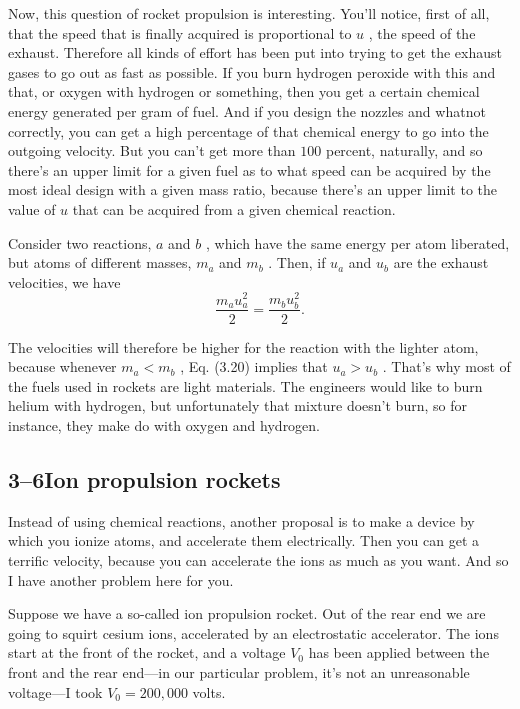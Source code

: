 \documentclass[11pt,oneside]{article}
\begin{document}
Now, this question of rocket propulsion is interesting. You'll notice, first of all, that the speed that is finally acquired is proportional to \(u\) , the speed of the exhaust. Therefore all kinds of effort has been put into trying to get the exhaust gases to go out as fast as possible. If you burn hydrogen peroxide with this and that, or oxygen with hydrogen or something, then you get a certain chemical energy generated per gram of fuel. And if you design the nozzles and whatnot correctly, you can get a high percentage of that chemical energy to go into the outgoing velocity. But you can't get more than \(100\) percent, naturally, and so there's an upper limit for a given fuel as to what speed can be acquired by the most ideal design with a given mass ratio, because there's an upper limit to the value of \(u\) that can be acquired from a given chemical reaction.\par

Consider two reactions, \(a\) and \(b\) , which have the same energy per atom liberated, but atoms of different masses, \(m_a\) and \(m_b\) . Then, if \(u_a\) and \(u_b\) are the exhaust velocities, we have 
\begin{equation*} \tag{3.20}
\label{Eq:TIPS:3:20} \frac{m_a u_a^2}{2} = \frac{m_b u_b^2}{2}. \end{equation*}
\par

The velocities will therefore be higher for the reaction with the lighter atom, because whenever \(m_a < m_b\) , Eq. (3.20) implies that \(u_a > u_b\) . That's why most of the fuels used in rockets are light materials. The engineers would like to burn helium with hydrogen, but unfortunately that mixture doesn't burn, so for instance, they make do with oxygen and hydrogen.\par

\subsection*{3--6Ion propulsion rockets}

Instead of using chemical reactions, another proposal is to make a device by which you ionize atoms, and accelerate them electrically. Then you can get a terrific velocity, because you can accelerate the ions as much as you want. And so I have another problem here for you.\par

Suppose we have a so-called ion propulsion rocket. Out of the rear end we are going to squirt cesium ions, accelerated by an electrostatic accelerator. The ions start at the front of the rocket, and a voltage \(V_0\) has been applied between the front and the rear end---in our particular problem, it's not an unreasonable voltage---I took \(V_0 = 200,\!000\) volts.\par
\end{document}

